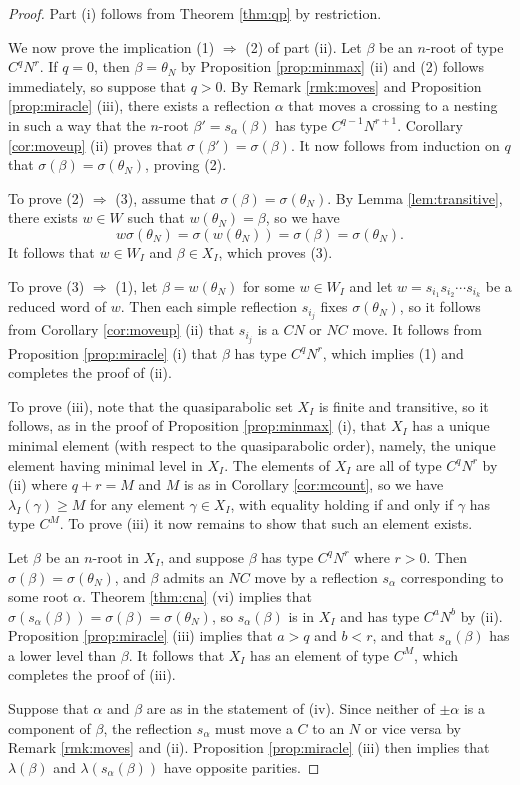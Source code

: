 \documentclass[11pt]{amsart}
\theoremstyle{plain}
\theoremstyle{definition}
\theoremstyle{remark}
\numberwithin{equation}{subsection}
\newcommand{\al}{\alpha}
\newcommand{\be}{\beta}
\begin{document}
\begin{proof}
Part (i) follows from Theorem \ref{thm:qp} by restriction.

We now prove the implication (1) $\Rightarrow$ (2) of part (ii).  Let $\be$ be
an $n$-root of type $C^q N^r$. If $q = 0$, then $\beta=\theta_N$ by Proposition
\ref{prop:minmax} (ii) and (2) follows immediately, so suppose that $q > 0$. By
Remark \ref{rmk:moves} and Proposition \ref{prop:miracle} (iii), there exists a
reflection $\al$ that moves a crossing to a nesting in such a way that the
$n$-root $\be' = s_{\al}(\be)$ has type $C^{q-1}N^{r+1}$.  Corollary
\ref{cor:moveup} (ii) proves that $\sigma(\be') = \sigma(\be)$.  It now follows
from induction on $q$ that $\sigma(\be) = \sigma(\theta_N)$, proving (2).

To prove (2) $\Rightarrow$ (3), assume that $\sigma(\be) = \sigma(\theta_N)$. By
Lemma \ref{lem:transitive}, there exists $w \in W$ such that $w(\theta_N) =
\be$, so we have $$
w\sigma(\theta_N)=\sigma(w(\theta_N))=\sigma(\be)=\sigma(\theta_N) .$$ It
follows that $w \in W_I$ and $\be \in X_I$, which proves (3).

To prove (3) $\Rightarrow$ (1), let $ \be = w(\theta_N)$ for some $w\in W_I$ and
let $w= s_{i_1}s_{i_2} \cdots s_{i_k}$ be a reduced word of $w$. Then each
simple reflection $s_{i_j}$ fixes $\sigma(\theta_N)$, so it follows from
Corollary \ref{cor:moveup} (ii)  that $s_{i_j}$ is a $CN$ or $NC$ move. It
follows from Proposition \ref{prop:miracle} (i) that $\be$ has type $C^q N^r$,
which implies (1) and completes the proof of (ii).

To prove (iii), note that the quasiparabolic set $X_I$ is finite and transitive,
so it follows, as in the proof of Proposition \ref{prop:minmax} (i), that $X_I$
has a unique minimal element (with respect to the quasiparabolic order), namely, the unique element having minimal
level in $X_I$.  The elements of $X_I$ are all of type $C^qN^r$ by (ii) where
$q+r=M$ and $M$ is as in Corollary \ref{cor:mcount}, so we have
$\lambda_I(\gamma)\ge M$ for any element $\gamma\in X_I$, with equality holding
if and only if $\gamma$ has type $C^M$. To prove (iii) it now remains to show
that such an element exists.

Let $\be$ be an $n$-root in $X_I$, and suppose $\beta$ has type $C^q N^r$ where
$r > 0$. Then $\sigma(\be)=\sigma(\theta_N)$, and $\beta$ admits an $NC$ move by
a reflection $s_\al$ corresponding to some root $\al$.  Theorem \ref{thm:cna}
(vi) implies that $\sigma(s_{\al}(\be)) = \sigma(\be)=\sigma(\theta_N)$, so
$s_\al(\be)$ is in $X_I$ and has type $C^a N^b$ by (ii).  Proposition
\ref{prop:miracle} (iii) implies that $a > q$ and $b < r$, and that $s_\al(\be)$
has a lower level than $\be$. It follows that $X_I$ has an element of type
$C^M$, which completes the proof of (iii).

Suppose that $\al$ and $\be$ are as in the statement of (iv). Since neither of
$\pm \al$ is a component of $\be$, the reflection $s_\al$ must move a $C$ to an
$N$ or vice versa by Remark \ref{rmk:moves} and (ii).  Proposition
\ref{prop:miracle} (iii) then implies that $\lambda(\be)$ and
$\lambda(s_\al(\be))$ have opposite parities.
\end{proof}
\end{document}
